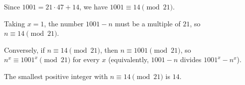 Since $1001=21\cdot47+14$, we have $1001\equiv14\pmod{21}$.

Taking $x=1$, the number $1001-n$ must be a multiple of $21$, so $n\equiv14\pmod{21}$.

Conversely, if $n\equiv14\pmod{21}$, then $n\equiv1001\pmod{21}$, so $n^x\equiv1001^x\pmod{21}$ for every $x$ (equivalently, $1001-n$ divides $1001^x-n^x$).

The smallest positive integer with $n\equiv14\pmod{21}$ is $\boxed{14}$.
